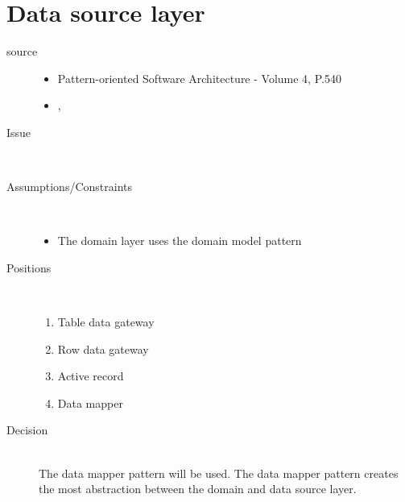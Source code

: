 \section{Data source layer}
\begin{description}

\item [source]
\begin{itemize}
\item Pattern-oriented Software Architecture - Volume 4, P.540 \cite{wiley-4}
\item \EAA \cite{eaa}, 
\end{itemize}

\item [Issue]~


\item [Assumptions/Constraints]~\\
\begin{itemize}
\item The domain layer uses the domain model pattern
\end{itemize}

\item [Positions]~
\begin{enumerate}
\item Table data gateway%
\item Row data gateway%
\item Active record %
\item Data mapper%
\end{enumerate}

\item [Decision] ~\\
The data mapper pattern will be used. The data mapper pattern creates the most abstraction between the domain and data source layer.


\end{description}
